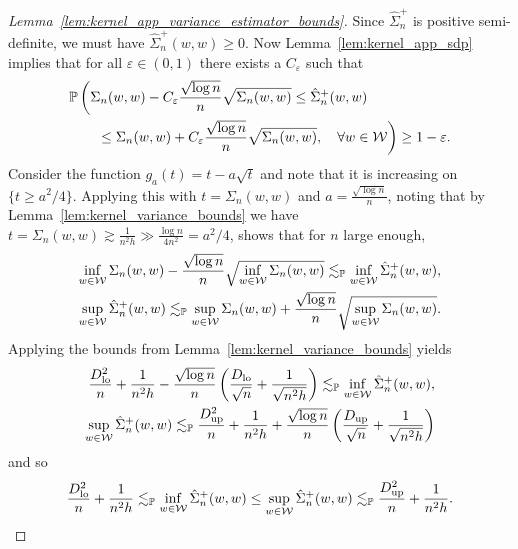 \begin{proof}[Lemma~\ref{lem:kernel_app_variance_estimator_bounds}]

  Since $\hat \Sigma_n^+$ is positive semi-definite,
  we must have $\hat \Sigma_n^+(w,w) \geq 0$.
  Now Lemma~\ref{lem:kernel_app_sdp}
  implies that for all $\varepsilon \in (0,1)$
  there exists a $C_\varepsilon$ such that
  \begin{align*}
    &\mathbb{P}\left(
      \Sigma_n(w,w) - C_\varepsilon \frac{\sqrt{\log n}}{n} \sqrt{\Sigma_n(w,w)}
      \leq
      \hat \Sigma_n^+(w,w)
      \right.
      \\
      &\left.
      \qquad\leq
      \Sigma_n(w,w) + C_\varepsilon \frac{\sqrt{\log n}}{n}
      \sqrt{\Sigma_n(w,w)},
      \quad \forall w \in \mathcal{W}
    \right)
    \geq 1-\varepsilon.
  \end{align*}
  Consider the function
  $g_a(t) = t - a \sqrt{t}$
  and note that it is increasing on $\{t \geq a^2/4\}$.
  Applying this with $t = \Sigma_n(w,w)$
  and $a = \frac{\sqrt{\log n}}{n}$,
  noting that by Lemma~\ref{lem:kernel_variance_bounds} we have
  $t = \Sigma_n(w,w) \gtrsim \frac{1}{n^2h}
  \gg \frac{\log n}{4n^2} = a^2/4$,
  shows that for $n$ large enough,
  \begin{align*}
    \inf_{w \in \mathcal{W}} \Sigma_n(w,w)
    - \frac{\sqrt{\log n}}{n} \sqrt{\inf_{w \in \mathcal{W}} \Sigma_n(w,w)}
    \lesssim_{\mathbb{P}}
    \inf_{w \in \mathcal{W}}\hat \Sigma_n^+(w,w), \\
    \sup_{w \in \mathcal{W}}\hat \Sigma_n^+(w,w)
    \lesssim_{\mathbb{P}}
    \sup_{w \in \mathcal{W}} \Sigma_n(w,w)
    + \frac{\sqrt{\log n}}{n} \sqrt{\sup_{w \in \mathcal{W}} \Sigma_n(w,w)}.
  \end{align*}
  Applying the bounds from Lemma~\ref{lem:kernel_variance_bounds}
  yields
  \begin{align*}
    \frac{D_{\textup{lo}}^2}{n} + \frac{1}{n^2h}
    - \frac{\sqrt{\log n}}{n}
    \left( \frac{D_{\textup{lo}}}{\sqrt n} + \frac{1}{\sqrt{n^2h}} \right)
    \lesssim_{\mathbb{P}}
    \inf_{w \in \mathcal{W}}\hat \Sigma_n^+(w,w), \\
    \sup_{w \in \mathcal{W}}\hat \Sigma_n^+(w,w)
    \lesssim_{\mathbb{P}}
    \frac{D_{\textup{up}}^2}{n} + \frac{1}{n^2h}
    + \frac{\sqrt{\log n}}{n}
    \left( \frac{D_{\textup{up}}}{\sqrt n} + \frac{1}{\sqrt{n^2h}} \right)
  \end{align*}
  and so
  \begin{align*}
    \frac{D_{\textup{lo}}^2}{n} + \frac{1}{n^2h}
    \lesssim_{\mathbb{P}}
    \inf_{w \in \mathcal{W}}\hat \Sigma_n^+(w,w)
    \leq
    \sup_{w \in \mathcal{W}}\hat \Sigma_n^+(w,w)
    \lesssim_{\mathbb{P}}
    \frac{D_{\textup{up}}^2}{n} + \frac{1}{n^2h}.
  \end{align*}
\end{proof}

